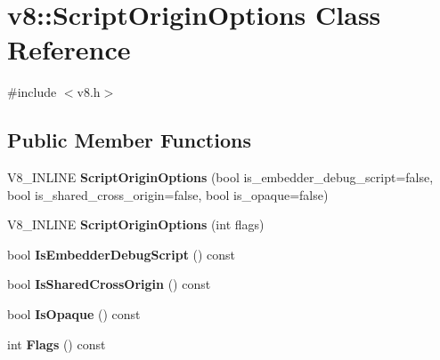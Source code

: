 \hypertarget{classv8_1_1_script_origin_options}{}\section{v8\+:\+:Script\+Origin\+Options Class Reference}
\label{classv8_1_1_script_origin_options}


{\ttfamily \#include $<$v8.\+h$>$}

\subsection*{Public Member Functions}
\begin{DoxyCompactItemize}
\item 
V8\+\_\+\+I\+N\+L\+I\+NE {\bfseries Script\+Origin\+Options} (bool is\+\_\+embedder\+\_\+debug\+\_\+script=false, bool is\+\_\+shared\+\_\+cross\+\_\+origin=false, bool is\+\_\+opaque=false)\hypertarget{classv8_1_1_script_origin_options_a350ff2a0c6b3b0449adefdd920d6808e}{}\label{classv8_1_1_script_origin_options_a350ff2a0c6b3b0449adefdd920d6808e}

\item 
V8\+\_\+\+I\+N\+L\+I\+NE {\bfseries Script\+Origin\+Options} (int flags)\hypertarget{classv8_1_1_script_origin_options_a5c814c5602db2c9ed5c6bc7f05b1d430}{}\label{classv8_1_1_script_origin_options_a5c814c5602db2c9ed5c6bc7f05b1d430}

\item 
bool {\bfseries Is\+Embedder\+Debug\+Script} () const \hypertarget{classv8_1_1_script_origin_options_a4076a3f22dff99a2337ab86d4024ee46}{}\label{classv8_1_1_script_origin_options_a4076a3f22dff99a2337ab86d4024ee46}

\item 
bool {\bfseries Is\+Shared\+Cross\+Origin} () const \hypertarget{classv8_1_1_script_origin_options_a28aa1b32efc3b20b16d65c4176831b4c}{}\label{classv8_1_1_script_origin_options_a28aa1b32efc3b20b16d65c4176831b4c}

\item 
bool {\bfseries Is\+Opaque} () const \hypertarget{classv8_1_1_script_origin_options_ae658f2c06876f86205af4f69804193ab}{}\label{classv8_1_1_script_origin_options_ae658f2c06876f86205af4f69804193ab}

\item 
int {\bfseries Flags} () const \hypertarget{classv8_1_1_script_origin_options_a17e20a214bc8df902419b81c32590efe}{}\label{classv8_1_1_script_origin_options_a17e20a214bc8df902419b81c32590efe}

\end{DoxyCompactItemize}

